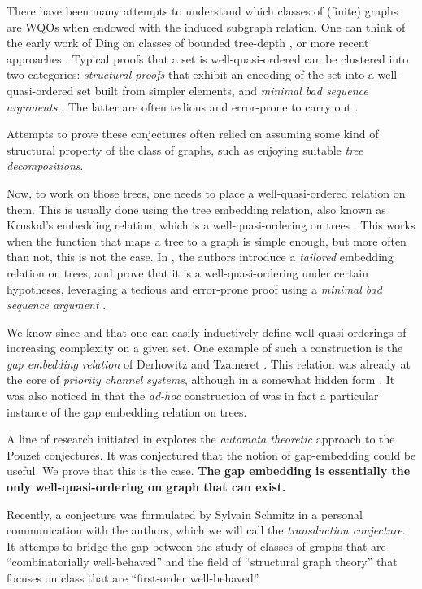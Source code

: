 There have been many attempts to understand
which classes of (finite) graphs are WQOs when endowed with the induced
subgraph relation. One can think of the early work of Ding on classes of
bounded tree-depth \cite{DING92}, or more recent approaches
\cite{DRT10,DLP17,POZA22}.
Typical proofs that a set is well-quasi-ordered can be clustered into two
categories: \emph{structural proofs} that exhibit an encoding of the set into a
well-quasi-ordered set built from simpler elements, and \emph{minimal bad
sequence arguments} \cite{NASH65}. The latter are often tedious and error-prone
to carry out \cite[Discussion xxx]{LOPEZ23}. 

Attempts to prove these conjectures often relied on assuming some kind of
structural property of the class of graphs, such as enjoying suitable
\emph{tree decompositions}.

Now, to work on those trees, one needs to place a well-quasi-ordered relation
on them. This is usually done using the tree embedding relation, also known as
Kruskal's embedding relation, which is a well-quasi-ordering on trees
\cite{KRU72}. This works when the function that maps a tree to a graph is
simple enough, but more often than not, this is not the case. In \cite{DRT10},
the authors introduce a \emph{tailored} embedding relation on trees, and prove
that it is a well-quasi-ordering under certain hypotheses, leveraging a tedious
and error-prone proof using a \emph{minimal bad sequence argument}
\cite{NASH65}. 

We know since \cite{FREU20} and \cite{LOPEZ23} that one can easily inductively
define well-quasi-orderings of increasing complexity on a given set. One
example of such a construction is the \emph{gap embedding relation} of
Derhowitz and Tzameret \cite{DERSHOWITZ200380}. This relation was already at
the core of \emph{priority channel systems}, although in a somewhat hidden form
\cite{HSS13}.  It was also noticed in \cite{LOPEZ24} that the \emph{ad-hoc}
construction of \cite{DRT10} was in fact a particular instance of the gap
embedding relation on trees.

A line of research initiated in \cite{LOPEZ24} explores the \emph{automata
theoretic} approach to the Pouzet conjectures. It was conjectured that the
notion of gap-embedding could be useful. We prove that this is the case.
\textbf{The gap embedding is essentially the only well-quasi-ordering on 
graph that can exist.}


Recently, a conjecture was formulated by Sylvain Schmitz in a personal
communication with the authors, which we will call the \emph{transduction
conjecture}. It attemps to bridge the gap between the study of
 classes of graphs that are ``combinatorially
well-behaved'' and the field of ``structural graph theory'' that focuses on
class that are ``first-order well-behaved''.


